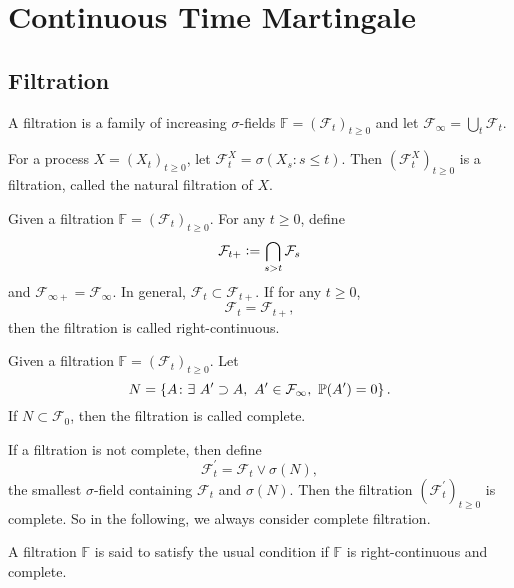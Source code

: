 \chapter{Continuous Time Martingale}

\section{Filtration}

\begin{defn}[Filtration]
    A filtration is a family of increasing $\sigma$-fields $\mathbb{F} = (\mathcal{F}_t)_{t \geq 0}$ and let $\mathcal{F}_\infty = \bigcup_{t}\mathcal{F}_t$.
\end{defn}

\begin{exam}
    For a process $X = (X_t)_{t \geq 0}$, let $\mathcal{F}^X_t = \sigma(X_s \colon s \leq t)$. Then $(\mathcal{F}^X_t)_{t \geq 0}$ is a filtration, called the natural filtration of $X$.
\end{exam}

\begin{defn}
    Given a filtration $\mathbb{F} = (\mathcal{F}_t)_{t \geq 0}$. For any $t \geq 0$, define
    \begin{equation*}
        \mathcal{F}_{t+} \vcentcolon= \bigcap_{s > t} \mathcal{F}_s
    \end{equation*}
    and $\mathcal{F}_{\infty +} = \mathcal{F}_\infty$. In general, $\mathcal{F}_t \subset \mathcal{F}_{t+}$. If for any $t \geq 0$,
    \begin{equation*}
        \mathcal{F}_t = \mathcal{F}_{t+},
    \end{equation*}
    then the filtration is called right-continuous.
\end{defn}


\begin{defn}[Completeness]
    Given a filtration $\mathbb{F} = (\mathcal{F}_t)_{t \geq 0}$. Let
    \begin{equation*}
        N = \left\{A \colon \exists~A^\prime \supset A,~A^\prime \in \mathcal{F}_\infty,~\mathbb{P}(A^\prime) = 0\right\}.
    \end{equation*}
    If $N \subset \mathcal{F}_0$, then the filtration is called complete.
\end{defn}
\begin{rmk}
    If a filtration is not complete, then define
    \begin{equation*}
        \mathcal{F}^\prime_t = \mathcal{F}_t \vee \sigma(N),
    \end{equation*}
    the smallest $\sigma$-field containing $\mathcal{F}_t$ and $\sigma(N)$. Then the filtration $(\mathcal{F}^\prime_t)_{t \geq 0}$ is complete. So in the following, we always consider complete filtration.
\end{rmk}
\begin{rmk}
    A filtration $\mathbb{F}$ is said to satisfy the usual condition if $\mathbb{F}$ is right-continuous and complete.
\end{rmk}

